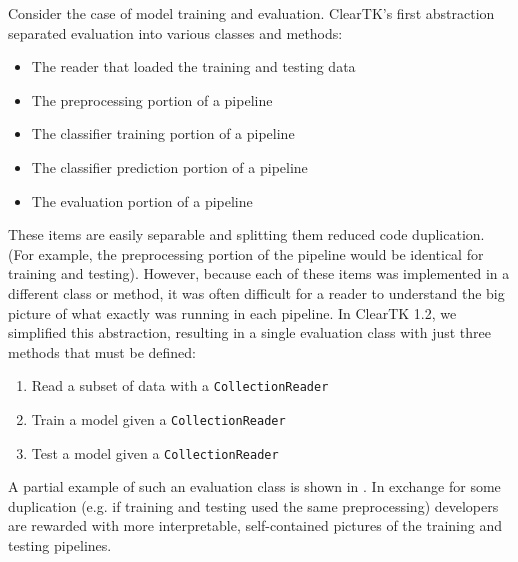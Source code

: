 \documentclass[10pt, a4paper]{article}
\newcommand{\code}[1]{\texttt{\small #1}}
\begin{document}
Consider the case of model training and evaluation.
ClearTK's first abstraction separated evaluation into various classes and methods:
\begin{itemize}
\item The reader that loaded the training and testing data
\item The preprocessing portion of a pipeline
\item The classifier training portion of a pipeline
\item The classifier prediction portion of a pipeline
\item The evaluation portion of a pipeline
\end{itemize}
These items are easily separable and splitting them reduced code duplication. (For example, the preprocessing portion of the pipeline would be identical for training and testing).
However, because each of these items was implemented in a different class or method, it was often difficult for a reader to understand the big picture of what exactly was running in each pipeline.
In ClearTK 1.2, we simplified this abstraction, resulting in a single evaluation class with just three methods that must be defined:
\begin{enumerate}
\item Read a subset of data with a \code{CollectionReader}
\item Train a model given a \code{CollectionReader}
\item Test a model given a \code{CollectionReader}
\end{enumerate}
A partial example of such an evaluation class is shown in .
In exchange for some duplication (e.g. if training and testing used the same preprocessing) developers are rewarded with more interpretable, self-contained pictures of the training and testing pipelines.
\end{document}
